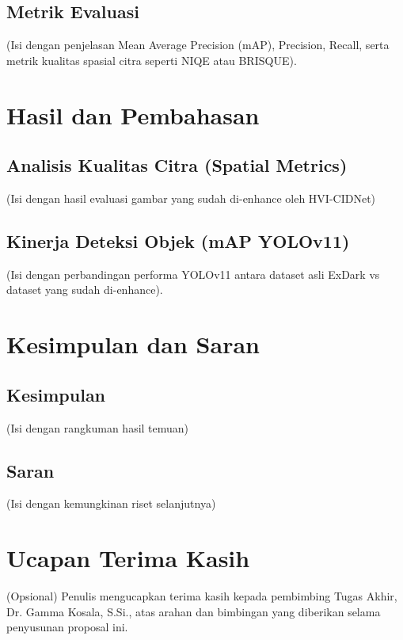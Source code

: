 \documentclass[conference]{IEEEtran}
\begin{document}
\subsection{Metrik Evaluasi}
(Isi dengan penjelasan Mean Average Precision (mAP), Precision, Recall, serta metrik kualitas spasial citra seperti NIQE atau BRISQUE).

\section{Hasil dan Pembahasan}

\subsection{Analisis Kualitas Citra (Spatial Metrics)}
(Isi dengan hasil evaluasi gambar yang sudah di-enhance oleh HVI-CIDNet)

\subsection{Kinerja Deteksi Objek (mAP YOLOv11)}
(Isi dengan perbandingan performa YOLOv11 antara dataset asli ExDark vs dataset yang sudah di-enhance).

\section{Kesimpulan dan Saran}

\subsection{Kesimpulan}
(Isi dengan rangkuman hasil temuan)

\subsection{Saran}
(Isi dengan kemungkinan riset selanjutnya)

\section*{Ucapan Terima Kasih}
(Opsional) Penulis mengucapkan terima kasih kepada pembimbing Tugas Akhir, Dr. Gamma Kosala, S.Si., atas arahan dan bimbingan yang diberikan selama penyusunan proposal ini.


\end{document}
